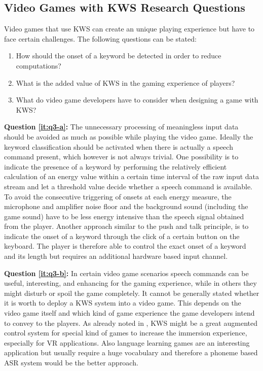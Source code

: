 \subsection{Video Games with KWS Research Questions}\label{sec:intro_rq_games}
Video games that use KWS can create an unique playing experience but have to face certain challenges.
The following questions can be stated:
\begin{enumerate}[label={Q.3.\alph*)}, leftmargin=1.75cm]
  \item How should the onset of a keyword be detected in order to reduce computations?\label{it:q3-a}
  \item What is the added value of KWS in the gaming experience of players?\label{it:q3-b}
  \item What do video game developers have to consider when designing a game with KWS?\label{it:q3-c}
\end{enumerate}
\noindent
\textbf{Question \ref{it:q3-a}:} 
The unnecessary processing of meaningless input data should be avoided as much as possible while playing the video game.
Ideally the keyword classification should be activated when there is actually a speech command present, which however is not always trivial.
One possibility is to indicate the presence of a keyword by performing the relatively efficient calculation of an energy value within a certain time interval of the raw input data stream and let a threshold value decide whether a speech command is available.
To avoid the consecutive triggering of onsets at each energy measure, the microphone and amplifier noise floor and the background sound (including the game sound) have to be less energy intensive than the speech signal obtained from the player.
Another approach similar to the push and talk principle, is to indicate the onset of a keyword through the click of a certain button on the keyboard.
The player is therefore able to control the exact onset of a keyword and its length but requires an additional hardware based input channel.

\textbf{Question \ref{it:q3-b}:}
In certain video game scenarios speech commands can be useful, interesting, and enhancing for the gaming experience, while in others they might disturb or spoil the game completely.
It cannot be generally stated whether it is worth to deploy a KWS system into a video game.
This depends on the video game itself and which kind of game experience the game developers intend to convey to the players.
As already noted in , KWS might be a great augmented control system for special kind of games to increase the immersion experience, especially for VR applications.
Also language learning games are an interesting application but usually require a huge vocabulary and therefore a phoneme based ASR system would be the better approach.

